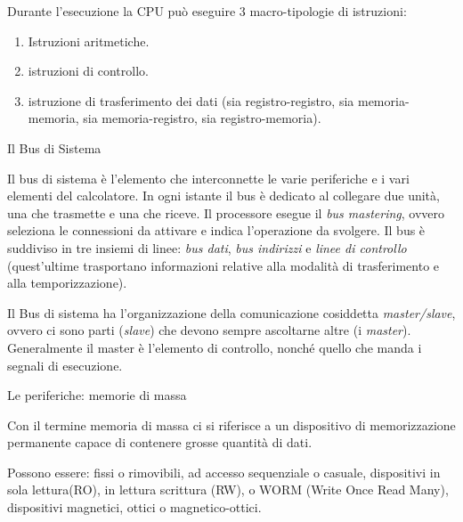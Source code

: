 \documentclass[
  paper=a4,
  oneside  ,captions=tableheading
]{scrbook}
\providecommand{\tightlist}{%
  \setlength{\itemsep}{0pt}\setlength{\parskip}{0pt}}
\begin{document}
Durante l'esecuzione la CPU può eseguire 3 macro-tipologie di
istruzioni:

\begin{enumerate}
\def\labelenumi{\arabic{enumi}.}
\tightlist
\item
  Istruzioni aritmetiche.
\item
  istruzioni di controllo.
\item
  istruzione di trasferimento dei dati (sia registro-registro, sia
  memoria-memoria, sia memoria-registro, sia registro-memoria).
\end{enumerate}

Il Bus di Sistema

Il bus di sistema è l'elemento che interconnette le varie periferiche e
i vari elementi del calcolatore. In ogni istante il bus è dedicato al
collegare due unità, una che trasmette e una che riceve. Il processore
esegue il \emph{bus mastering}, ovvero seleziona le connessioni da
attivare e indica l'operazione da svolgere. Il bus è suddiviso in tre
insiemi di linee: \emph{bus dati}, \emph{bus indirizzi} e \emph{linee di
controllo} (quest'ultime trasportano informazioni relative alla modalità
di trasferimento e alla temporizzazione).

Il Bus di sistema ha l'organizzazione della comunicazione cosiddetta
\emph{master/slave}, ovvero ci sono parti (\emph{slave}) che devono
sempre ascoltarne altre (i \emph{master}). Generalmente il master è
l'elemento di controllo, nonché quello che manda i segnali di
esecuzione.

Le periferiche: memorie di massa

Con il termine memoria di massa ci si riferisce a un dispositivo di
memorizzazione permanente capace di contenere grosse quantità di dati.

Possono essere: fissi o rimovibili, ad accesso sequenziale o casuale,
dispositivi in sola lettura(RO), in lettura scrittura (RW), o WORM
(Write Once Read Many), dispositivi magnetici, ottici o
magnetico-ottici.
\end{document}
